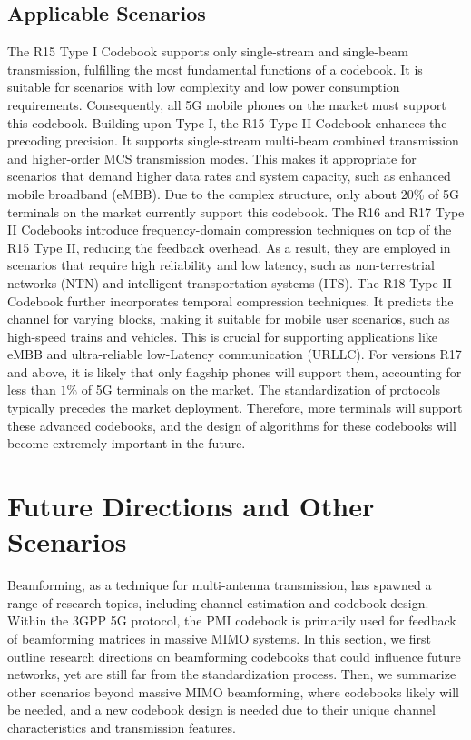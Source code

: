 \documentclass[lettersize,journal]{IEEEtran}
\begin{document}
\subsection{Applicable Scenarios}
The R15 Type I Codebook supports only single-stream and single-beam transmission, fulfilling the most fundamental functions of a codebook. It is suitable for scenarios with low complexity and low power consumption requirements. Consequently, all 5G mobile phones on the market must support this codebook. Building upon Type I, the R15 Type II Codebook enhances the precoding precision. It supports single-stream multi-beam combined transmission and higher-order MCS transmission modes. This makes it appropriate for scenarios that demand higher data rates and system capacity, such as enhanced mobile broadband (eMBB). Due to the complex structure, only about $20\%$ of 5G terminals on the market currently support this codebook. The R16 and R17 Type II Codebooks introduce frequency-domain compression techniques on top of the R15 Type II, reducing the feedback overhead. As a result, they are employed in scenarios that require high reliability and low latency, such as non-terrestrial networks (NTN) and intelligent transportation systems (ITS). The R18 Type II Codebook further incorporates temporal compression techniques. It predicts the channel for varying blocks, making it suitable for mobile user scenarios, such as high-speed trains and vehicles. This is crucial for supporting applications like eMBB and ultra-reliable low-Latency communication (URLLC). For versions R17 and above, it is likely that only flagship phones will support them, accounting for less than $1\%$ of 5G terminals on the market. The standardization of protocols typically precedes the market deployment. Therefore, more terminals will support these advanced codebooks, and the design of algorithms for these codebooks will become extremely important in the future.


\section{Future Directions and Other Scenarios}\label{futuredirection}
Beamforming, as a technique for multi-antenna transmission, has spawned a range of research topics, including channel estimation and codebook design. Within the 3GPP 5G protocol, the PMI codebook is primarily used for feedback of beamforming matrices in massive MIMO systems. In this section, we first outline research directions on beamforming codebooks that could influence future networks, yet are still far from the standardization process. Then, we summarize other scenarios beyond massive MIMO beamforming, where codebooks likely will be needed, and a new codebook design is needed due to their unique channel characteristics and transmission features.
\end{document}
